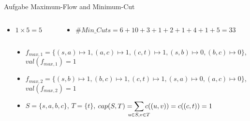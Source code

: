 \begin{frame}[allowframebreaks]{Aufgabe \thesection}{Maximum-Flow and Minimum-Cut}
\begin{solutionnoinc}
\begin{columns}
\begin{column}{0.5\textwidth}
      \end{column}
    \end{columns}
  \end{solutionnoinc}
  \begin{solution}
    \begin{columns}
      \begin{column}{0.5\textwidth}
        \begin{itemize}
          \item $1\times 5 = 5$
        \end{itemize}
      \end{column}
      \begin{column}{0.5\textwidth}
        \begin{itemize}
          \item $\#Min\_Cuts = 6 + 10 + 3 + 1 + 2 + 1 + 4 + 1 + 5 = 33$
        \end{itemize}
      \end{column}
    \end{columns}
  \end{solution}
  \begin{solution}
    \begin{columns}
      \begin{column}{0.4\textwidth}
      \end{column}
      \begin{column}{0.6\textwidth}
        \begin{itemize}
          \item $f_{max, 1} = \{(s, a)\mapsto 1, (a, c)\mapsto 1, (c, t)\mapsto 1, (s, b)\mapsto 0, (b, c)\mapsto 0\}$, $val(f_{max, 1}) = 1$
          \item $f_{max, 2} = \{(s, b)\mapsto 1, (b, c)\mapsto 1, (c, t)\mapsto 1, (s, a)\mapsto 0, (a, c)\mapsto 0\}$, $val(f_{max, 2}) = 1$
          \item $S = \{s, a, b, c\}$, $T = \{t\}$, $\displaystyle cap(S, T)=\sum_{\mathclap{\substack{u\in S, v\in T}}} c((u, v)) = c((c, t)) = 1$
        \end{itemize}
      \end{column}

\end{columns}
\end{solution}
\end{frame}
